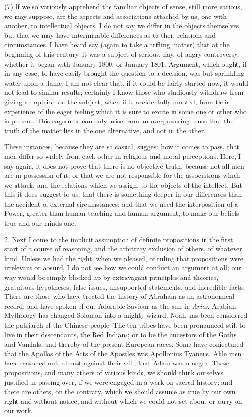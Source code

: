 (7) If we so variously apprehend the familiar objects of sense,
still more various, we may suppose, are the aspects and associations
attached by us, one with another, to intellectual objects. I do not
say we differ in the objects themselves, but that we may have
interminable differences as to their relations and
circumstances. I have heard say (again to take a trifling matter)
that at the beginning of this century, it was a subject of serious,
nay, of angry controversy, whether it began with January 1800, or
January 1801. Argument, which ought, if in any case, to have easily
brought the question to a decision, was but sprinkling water upon a
flame. I am not clear that, if it could be fairly started now, it
would not lead to similar results; certainly I know those who
studiously withdraw from giving an opinion on the subject, when it is
accidentally mooted, from their experience of the eager feeling which
it is sure to excite in some one or other who is present. This
eagerness can only arise from an overpowering sense that the truth of
the matter lies in the one alternative, and not in the other.

These instances, because they are so casual, suggest how it comes
to pass, that men differ so widely from each other in religious and
moral perceptions. Here, I say again, it does not prove that there is
no objective truth, because not all men are in possession of it; or
that we are not responsible for the associations which we attach, and
the relations which we assign, to the objects of the intellect. But
this it does suggest to us, that there is something deeper in our
differences than the accident of external circumstances; and that we
need the interposition of a Power, greater than human teaching and
human argument, to make our beliefs true and our minds one.

2. Next I come to the implicit assumption of definite propositions
in the first start of a course of reasoning, and the arbitrary
exclusion of others, of whatever kind. Unless we had the right,
when we pleased, of ruling that propositions were irrelevant or
absurd, I do not see how we could conduct an argument at all; our way
would be simply blocked up by extravagant principles and theories,
gratuitous hypotheses, false issues, unsupported statements, and
incredible facts. There are those who have treated the history of
Abraham as an astronomical record, and have spoken of our Adorable
Saviour as the sun in \emph{Aries}. Arabian Mythology has changed Solomon
into a mighty wizard. Noah has been considered the patriarch of the
Chinese people. The ten tribes have been pronounced still to live in
their descendants, the Red Indians; or to be the ancestors of the
Goths and Vandals, and thereby of the present European races. Some
have conjectured that the Apollos of the Acts of the Apostles was
Apollonius Tyaneus. Able men have reasoned out, almost against their
will, that Adam was a negro. These propositions, and many others of
various kinds, we should think ourselves justified in passing over, if
we were engaged in a work on sacred history; and there are others, on
the contrary, which we should assume as true by our own right and
without notice, and without which we could not set about or carry on
our work.

